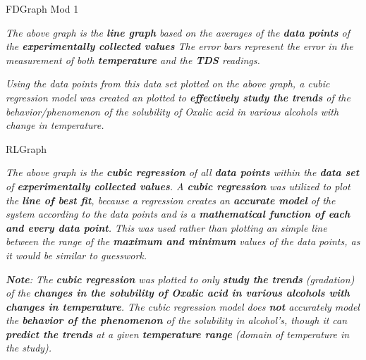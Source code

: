             

{FDGraph Mod 1}


\textit{The above graph is the \textbf{line graph} based on the averages of the \textbf{data points} of the \textbf{experimentally collected values} The error bars represent the error in the measurement of both \textbf{temperature} and the \textbf{TDS} readings.}

\textit{Using the data points from this data set plotted on the above graph, a cubic regression model was created an plotted to \textbf{effectively study the trends} of the behavior/phenomenon of the solubility of Oxalic acid in various alcohols with change in temperature.}

{RLGraph}

\textit{The above graph is the \textbf{cubic regression} of all \textbf{data points} within the \textbf{data set} of \textbf{experimentally collected values}. A \textbf{cubic regression} was utilized to plot the \textbf{line of best fit}, because a regression creates an \textbf{accurate model} of the system according to the data points and is a \textbf{mathematical function of each and every data point}. This was used rather than plotting an simple line between the range of the \textbf{maximum and minimum} values of the data points, as it would be similar to guesswork.}

\textit{\textbf{Note}: The \textbf{cubic regression} was plotted to only \textbf{study the trends} (gradation) of the \textbf{changes in the solubility of Oxalic acid in various alcohols with changes in temperature}. The cubic regression model does \textbf{not} accurately model the \textbf{behavior of the phenomenon} of the solubility in alcohol's, though it can \textbf{predict the trends} at a given \textbf{temperature range} (domain of temperature in the study).}

